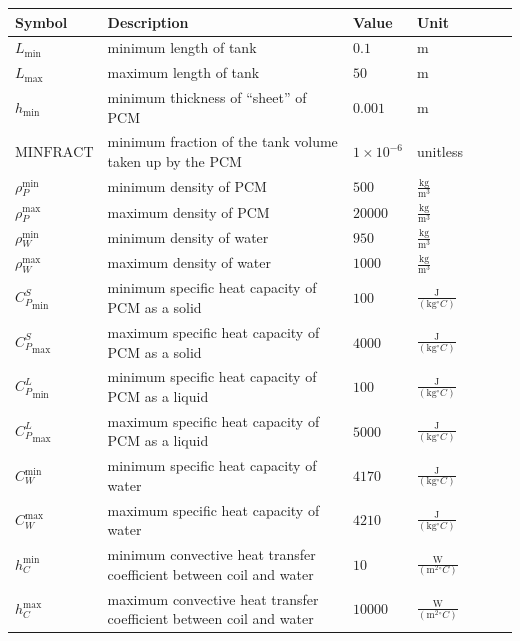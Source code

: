 \documentclass[12pt]{article}
\begin{document}
\begin{tabular}{l p{10cm} l l l l l}
\toprule
Symbol & Description & Value & Unit
\\
\midrule
${L_\text{min}}$ & minimum length of tank & $0.1$ & m
\\
${L_{\text{max}}}$ & maximum length of tank & $50$ & m
\\
${h_{\text{min}}}$ & minimum thickness of ``sheet'' of PCM & $0.001$ &
                                                                       $\text{m}$
\\
$\text{MINFRACT}$ & minimum fraction of the tank volume taken up by the PCM &
                                                                              $ 1 \times 10^{-6}$ & unitless
\\
${\rho{}_{P}^{\text{min}}}$ & minimum density of PCM & $500$ & $\frac{\text{kg}}{\text{m}^{3}}$
\\
${\rho{}_{P}^{\text{max}}}$ & maximum density of PCM & $20000$ & $\frac{\text{kg}}{\text{m}^{3}}$
\\
${\rho{}_{W}^{\text{min}}}$ & minimum density of water & $950$ & $\frac{\text{kg}}{\text{m}^{3}}$
\\
${\rho{}_{W}^{\text{max}}}$ & maximum density of water & $1000$ & $\frac{\text{kg}}{\text{m}^{3}}$
\\
${{C_{P}^{S}}_{\text{min}}}$ & minimum specific heat capacity of PCM as a solid & $100$ & $\frac{\text{J}}{(\text{kg}{}^{\circ}C)}$
\\
${{C_{P}^{S}}_{\text{max}}}$ & maximum specific heat capacity of PCM as a solid & $4000$ & $\frac{\text{J}}{(\text{kg}{}^{\circ}C)}$
\\
${{C_{P}^{L}}_{\text{min}}}$ & minimum specific heat capacity of PCM as a liquid & $100$ & $\frac{\text{J}}{(\text{kg}{}^{\circ}C)}$
\\
${{C_{P}^{L}}_{\text{max}}}$ & maximum specific heat capacity of PCM as a liquid & $5000$ & $\frac{\text{J}}{(\text{kg}{}^{\circ}C)}$
\\
${C_{W}^{\text{min}}}$ & minimum specific heat capacity of water & $4170$ & $\frac{\text{J}}{(\text{kg}{}^{\circ}C)}$
\\
${C_{W}^{\text{max}}}$ & maximum specific heat capacity of water & $4210$ & $\frac{\text{J}}{(\text{kg}{}^{\circ}C)}$
\\
${h_{C}^{\text{min}}}$ & minimum convective heat transfer coefficient between coil and water & $10$ & $\frac{\text{W}}{(\text{m}^{2}{}^{\circ}C)}$
\\
${h_{C}^{\text{max}}}$ & maximum convective heat transfer coefficient between coil and water & $10000$ & $\frac{\text{W}}{(\text{m}^{2}{}^{\circ}C)}$

\end{tabular}
\end{document}
